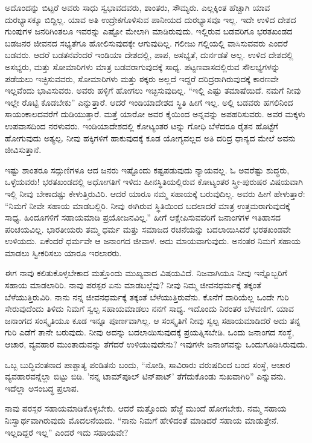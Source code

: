 ಅದೊಂದನ್ನು ಬಿಟ್ಟರೆ ಅವರು ಸಾಧು ಸ್ವಭಾವದವರು, ಶಾಂತರು, ಸೌಮ್ಯರು. ಎಲ್ಲಕ್ಕಿಂತ ಹೆಚ್ಚಾಗಿ ಯಾವ ದುರಭ್ಯಾಸಕ್ಕೂ ಬಿದ್ದಿಲ್ಲ. ಯಾವ ಅತಿ ಉದ್ರೇಕಗೊಳಿಸುವ ಪಾನೀಯದ ದುರಭ್ಯಾಸವೂ ಇಲ್ಲ. ಇದೇ ಉಳಿದ ದೇಶದ ಗುಂಪುಗಳ ಜನರಿಗಿಂತಲೂ ಇವರನ್ನು ಎಷ್ಟೋ ಮೇಲಾಗಿ ಮಾಡಿರುವುದು. ಇಲ್ಲಿರುವ ಬಡವರಿಗೂ ಭರತಖಂಡದ ಬಡಜನರ ಜೀವನದ ಸಭ್ಯತೆಗೂ ಹೋಲಿಸುವುದಕ್ಕೇ ಆಗುವುದಿಲ್ಲ. ಗಲೀಜು ಗಲ್ಲಿಯಲ್ಲಿ ವಾಸಿಸುವವರು ಎಂದರೆ ಬಡವರು. ಆದರೆ ಬಡತನವೆಂದರೆ ಇಂಡಿಯಾ ದೇಶದಲ್ಲಿ, ಪಾಪ, ಅಸಭ್ಯತೆ, ದುರ್ನಡತೆ ಅಲ್ಲ. ಉಳಿದ ದೇಶದಲ್ಲಿ ಅಸಭ್ಯರು, ಮತ್ತು ಸೋಮಾರಿಗಳು ಮಾತ್ರ ಬಡವರಾಗುವುದಕ್ಕೆ ಸಾಧ್ಯ. ಪಟ್ಟಣವಾಸದಲ್ಲಿರುವ ಸೌಲಭ್ಯಗಳನ್ನು ಪಡೆಯಲು ಇಚ್ಛಿಸುವವರು, ಸೋಮಾರಿಗಳು ಮತ್ತು ಠಕ್ಕರು ಅಲ್ಲದೆ ಇದ್ದರೆ ದರಿದ್ರರಾಗಿರುವುದಕ್ಕೆ ಕಾರಣವೇ ಇಲ್ಲವೆಂದು ಭಾವಿಸುವರು. ಅವರು ಹಳ್ಳಿಗೆ ಹೋಗಲು ಇಚ್ಛಿಸುವುದಿಲ್ಲ. “ಇಲ್ಲಿ ಎಷ್ಟು ತಮಾಷೆಯಿದೆ. ನಮಗೆ ನೀವು ಇಲ್ಲೇ ರೊಟ್ಟಿ ಕೊಡಬೇಕು” ಎನ್ನುತ್ತಾರೆ. ಆದರೆ ಇಂಡಿಯಾದೇಶದ ಸ್ಥಿತಿ ಹೀಗೆ ಇಲ್ಲ. ಅಲ್ಲಿ ಬಡವರು ಹಗಲಿನಿಂದ ಸಾಯಂಕಾಲದವರೆಗೆ ದುಡಿಯುತ್ತಾರೆ. ಮತ್ತೆ ಯಾರೋ ಅವರ ಕೈಯಿಂದ ಅನ್ನವನ್ನು ಅಪಹರಿಸುವರು. ಅವರ ಮಕ್ಕಳು ಉಪವಾಸದಿಂದ ನರಳುವರು. ಇಂಡಿಯಾದೇಶದಲ್ಲಿ ಕೋಟ್ಯಂತರ ಟನ್ನು ಗೋಧಿ ಬೆಳೆದರೂ ರೈತನ ಹೊಟ್ಟೆಗೆ ಹೋಗುವುದು ಅತ್ಯಲ್ಪ. ನೀವು ಹಕ್ಕಿಗಳಿಗೆ ಹಾಕುವುದಕ್ಕೆ ಕೂಡ ಯೋಗ್ಯವಲ್ಲದ ಅತಿ ದರಿದ್ರ ಧಾನ್ಯದ ಮೇಲೆ ಅವನು ಜೀವಿಸುತ್ತಾನೆ.

ಇಷ್ಟು ಶಾಂತರೂ ಸದ್ಗುಣಿಗಳೂ ಆದ ಜನರು ಇಷ್ಟೊಂದು ಕಷ್ಟಪಡುವುದು ನ್ಯಾಯವಲ್ಲ. ಓ ಅವರೆಷ್ಟು ಶುದ್ಧರು, ಒಳ್ಳೆಯವರು! ಭರತಖಂಡದಲ್ಲಿ ಅಧೋಗತಿಗೆ ಇಳಿದು ಹೀನಸ್ಥಿತಿಯಲ್ಲಿರುವ ಕೋಟ್ಯಂತರ ಸ್ತ್ರೀ-ಪುರುಷರ ವಿಷಯವಾಗಿ ಇಲ್ಲಿ ನೀವು ಬೇಕಾದಷ್ಟು ಕೇಳುತ್ತಿರುವಿರಿ. ಆದರೆ ಯಾರೂ ನಮ್ಮ ಸಹಾಯಕ್ಕೆ ಬರುವುದಿಲ್ಲ. ಅವರು ಹೀಗೆ ಹೇಳುತ್ತಾರೆ: “ನಿಮಗೆ ನೀವೇ ಸಹಾಯ ಮಾಡಬಲ್ಲಿರಿ. ನೀವು ಈಗಿರುವ ಸ್ಥಿತಿಯಿಂದ ಬದಲಾದರೆ ಮಾತ್ರ ಉತ್ತಮರಾಗುವುದಕ್ಕೆ ಸಾಧ್ಯ. ಹಿಂದೂಗಳಿಗೆ ಸಹಾಯಮಾಡಿ ಪ್ರಯೋಜನವಿಲ್ಲ.” ಹೀಗೆ ಆಕ್ಷೇಪಿಸುವವರಿಗೆ ಜನಾಂಗಗಳ ಇತಿಹಾಸದ ಪರಿಚಯವಿಲ್ಲ. ಭಾರತೀಯರು ತಮ್ಮ ಧರ್ಮ ಮತ್ತು ಸಮಾಜದ ರಚನೆಯನ್ನು ಬದಲಾಯಿಸಿದರೆ ಭರತಖಂಡವೇ ಉಳಿಯದು. ಏಕೆಂದರೆ ಧರ್ಮವೇ ಆ ಜನಾಂಗದ ಜೀವಾಳ. ಅದು ಮಾಯವಾಗುವುದು. ಅನಂತರ ನಿಮಗೆ ಸಹಾಯ ಮಾಡಲು ಸ್ವೀಕರಿಸಲು ಯಾರೂ ಇರಲಾರರು.

ಈಗ ನಾವು ಕಲಿತುಕೊಳ್ಳಬೇಕಾದ ಮತ್ತೊಂದು ಮುಖ್ಯವಾದ ವಿಷಯವಿದೆ. ನಿಜವಾಗಿಯೂ ನೀವು ಇನ್ನೊಬ್ಬರಿಗೆ ಸಹಾಯ ಮಾಡಲಾರಿರಿ. ನಾವು ಪರಸ್ಪರ ಏನು ಮಾಡಬಲ್ಲೆವು? ನೀವು ನಿಮ್ಮ ಜೀವನಧರ್ಮಕ್ಕೆ ತಕ್ಕಂತೆ ಬೆಳೆಯುತ್ತಿರುವಿರಿ. ನಾನು ನನ್ನ ಜೀವನಧರ್ಮಕ್ಕೆ ತಕ್ಕಂತೆ ಬೆಳೆಯುತ್ತಿರುವೆನು. ಕೊನೆಗೆ ದಾರಿಯೆಲ್ಲ ಒಂದೇ ಗುರಿ ಸೇರುವುದೆಂದು ತಿಳಿದು ನಿಮಗೆ ಸ್ವಲ್ಪ ಸಹಾಯಮಾಡಲು ನನಗೆ ಸಾಧ್ಯ. ಇದೊಂದು ನಿರಂತರ ಬೆಳವಣಿಗೆ. ಯಾವ ಜನಾಂಗದ ಸಂಸ್ಕೃತಿಯೂ ಕೂಡ ಇನ್ನೂ ಪೂರ್ಣವಾಗಿಲ್ಲ. ಆ ಸಂಸ್ಕೃತಿಗೆ ನೀವು ಸ್ವಲ್ಪ ಸಹಾಯಮಾಡಿದರೆ ಅದು ತನ್ನ ಗುರಿ ಎಡೆಗೆ ತಾನೇ ಬರುವುದು. ನೀವು ಅದನ್ನು ಬದಲಾಯಿಸುವುದಕ್ಕೆ ಪ್ರಯತ್ನಿಸಬೇಡಿ. ಒಂದು ಜನಾಂಗದ ಸಂಸ್ಥೆ, ಆಚಾರ, ವ್ಯವಹಾರ ಮುಂತಾದುವನ್ನು ತೆಗೆದರೆ ಉಳಿಯುವುದೇನು? ಇವುಗಳೇ ಜನಾಂಗವನ್ನು ಒಂದುಗೂಡಿಸಿರುವುದು.

ಒಬ್ಬ ಬುದ್ಧಿವಂತನಾದ ಪಾಶ್ಚಾತ್ಯ ಪಂಡಿತನು ಬಂದು, “ನೋಡಿ, ಸಾವಿರಾರು ವರುಷದಿಂದ ಬಂದ ಸಂಸ್ಥೆ, ಆಚಾರ ವ್ಯವಹಾರವನ್ನೆಲ್ಲಾ ಬಿಟ್ಟು ಬಿಡಿ. 'ನನ್ನ ಟಾಮ್‌ಪೂಲ್ ಟಿನ್‌ಪಾಟ್' ತೆಗೆದುಕೊಂಡು ಸುಖವಾಗಿರಿ” ಎನ್ನುವನು. ಇದೆಲ್ಲಾ ಅಸಂಬದ್ಧ ಪ್ರಲಾಪ.

ನಾವು ಪರಸ್ಪರ ಸಹಾಯಮಾಡಿಕೊಳ್ಳಬೇಕು. ಆದರೆ ಮತ್ತೊಂದು ಹೆಜ್ಜೆ ಮುಂದೆ ಹೋಗಬೇಕು. ನಮ್ಮ ಸಹಾಯ ನಿಃಸ್ವಾರ್ಥವಾಗಿರುವುದು ಮೊದಲನೆಯದು. “ನಾನು ನಿಮಗೆ ಹೇಳಿದಂತೆ ಮಾಡಿದರೆ ಸಹಾಯ ಮಾಡುತ್ತೇನೆ. ಇಲ್ಲದಿದ್ದರೆ ಇಲ್ಲ” ಎಂದರೆ ಇದು ಸಹಾಯವೇ?

